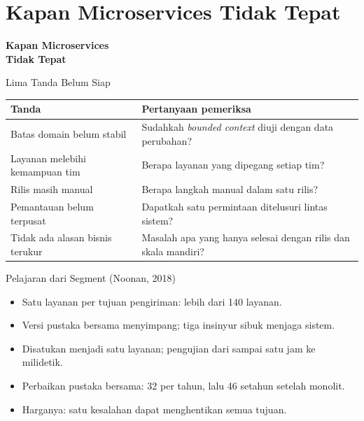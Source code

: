 \documentclass[aspectratio=169, table, 12pt]{beamer}
\begin{document}
\section{Kapan Microservices Tidak Tepat}

\begin{frame}{\hfill}
  \centering
  \Huge{\textbf{Kapan Microservices\\Tidak Tepat}}
\end{frame}

\begin{frame}{{\Large Lima Tanda Belum Siap}}
  \footnotesize
  \begin{tabularx}{\textwidth}{>{\raggedright\arraybackslash}p{4.0cm}
      >{\raggedright\arraybackslash}X}
    \hline
    \textbf{Tanda} & \textbf{Pertanyaan pemeriksa} \\
    \hline
    Batas domain belum stabil & Sudahkah \textit{bounded context} diuji dengan data perubahan? \\
    \hline
    Layanan melebihi kemampuan tim & Berapa layanan yang dipegang setiap tim? \\
    \hline
    Rilis masih manual & Berapa langkah manual dalam satu rilis? \\
    \hline
    Pemantauan belum terpusat & Dapatkah satu permintaan ditelusuri lintas sistem? \\
    \hline
    Tidak ada alasan bisnis terukur & Masalah apa yang hanya selesai dengan rilis dan skala
      mandiri? \\
    \hline
  \end{tabularx}
\end{frame}

\begin{frame}{{\Large Pelajaran dari Segment (Noonan, 2018)}}
  \vspace{10pt}
  \begin{itemize}
    \item Satu layanan per tujuan pengiriman: lebih dari 140 layanan.
    \item Versi pustaka bersama menyimpang; tiga insinyur sibuk menjaga sistem.
    \item Disatukan menjadi satu layanan; pengujian dari sampai satu jam ke milidetik.
    \item Perbaikan pustaka bersama: 32 per tahun, lalu 46 setahun setelah monolit.
    \item Harganya: satu kesalahan dapat menghentikan semua tujuan.
  \end{itemize}
\end{frame}
\end{document}
